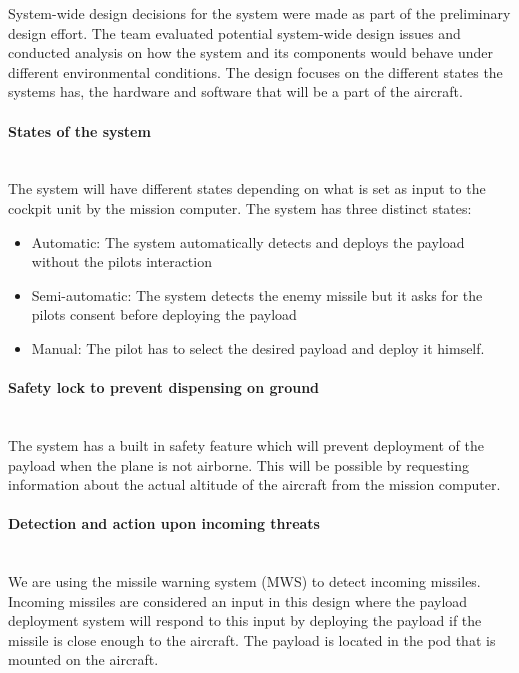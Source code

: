 System-wide design decisions for the system were made as part of the preliminary design effort. The team evaluated potential system-wide design issues and conducted analysis on how the system and its components would behave under different environmental conditions. The design focuses on the different states the systems has, the hardware and software that will be a part of the aircraft.

\paragraph{States of the system} \makebox{} \\
The system will have different states depending on what is set as input to the cockpit unit by the mission computer. The system has three distinct states: 
\begin{itemize}
\item Automatic: The system automatically detects and deploys the payload without the pilots interaction
\item Semi-automatic: The system detects the enemy missile but it asks for the pilots consent before deploying the payload
\item Manual: The pilot has to select the desired payload and deploy it himself.
\end{itemize}


\paragraph{Safety lock to prevent dispensing on ground}  \makebox{} \\
The system has a built in safety feature which will prevent deployment of the payload when the plane is not airborne. This will be possible by requesting information about the actual altitude of the aircraft from the mission computer.

\paragraph{Detection and action upon incoming threats}  \makebox{} \\
We are using the missile warning system (MWS) to detect incoming missiles. Incoming missiles are considered an input in this design where the payload deployment system will respond to this input by deploying the payload if the missile is close enough to the aircraft. The payload is located in the pod that is mounted on the aircraft.

